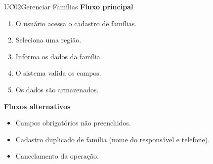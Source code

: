 \vspace{8pt}

\begin{usecase}{UC02}{Gerenciar Famílias}
    \uclinha
    \uclinha
    \uclinha
    \textbf{Fluxo principal}
    \vspace{4pt}
    \begin{enumerate}
        \item O usuário acessa o cadastro de famílias.
        \item Seleciona uma região.
        \item Informa os dados da família.
        \item O sistema valida os campos.
        \item Os dados são armazenados.
    \end{enumerate}
    \uclinha
    \textbf{Fluxos alternativos}
    \vspace{4pt}
    \begin{itemize}
        \item Campos obrigatórios não preenchidos.
        \item Cadastro duplicado de família (nome do responsável e telefone).
        \item Cancelamento da operação.
    \end{itemize}
    \uclinha
\end{usecase}

\vspace{8pt}

